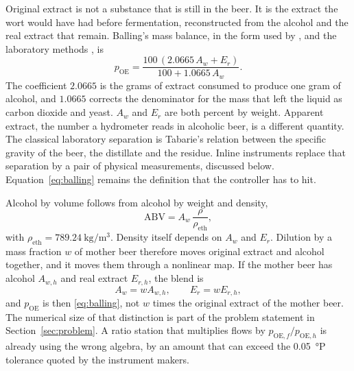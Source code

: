 Original extract is not a substance that is still in the beer. It is the extract the wort would have had before fermentation, reconstructed from the alcohol and the real extract that remain. Balling's mass balance, in the form used by \citet{kunze2019}, \citet{holle2003} and the laboratory methods \citep{mebak2013,asbc2014,ebcanalytica}, is
\begin{equation}
\label{eq:balling}
p_{\mathrm{OE}}
=
\frac{100\,(2.0665\,A_w + E_r)}{100 + 1.0665\,A_w}.
\end{equation}
The coefficient $2.0665$ is the grams of extract consumed to produce one gram of alcohol, and $1.0665$ corrects the denominator for the mass that left the liquid as carbon dioxide and yeast. $A_w$ and $E_r$ are both percent by weight. Apparent extract, the number a hydrometer reads in alcoholic beer, is a different quantity. The classical laboratory separation is Tabarie's relation between the specific gravity of the beer, the distillate and the residue. Inline instruments replace that separation by a pair of physical measurements, discussed below. Equation~\eqref{eq:balling} remains the definition that the controller has to hit.

Alcohol by volume follows from alcohol by weight and density,
\begin{equation}
\label{eq:abv}
\mathrm{ABV}
=
A_w\,\frac{\rho}{\rho_{\mathrm{eth}}},
\end{equation}
with $\rho_{\mathrm{eth}} = \SI{789.24}{\kilogram\per\cubic\metre}$. Density itself depends on $A_w$ and $E_r$. Dilution by a mass fraction $w$ of mother beer therefore moves original extract and alcohol together, and it moves them through a nonlinear map. If the mother beer has alcohol $A_{w,h}$ and real extract $E_{r,h}$, the blend is
\begin{equation}
\label{eq:dilute}
A_w = w A_{w,h},
\qquad
E_r = w E_{r,h},
\end{equation}
and $p_{\mathrm{OE}}$ is then \eqref{eq:balling}, not $w$ times the original extract of the mother beer. The numerical size of that distinction is part of the problem statement in Section~\ref{sec:problem}. A ratio station that multiplies flows by $p_{\mathrm{OE},f}/p_{\mathrm{OE},h}$ is already using the wrong algebra, by an amount that can exceed the \SI{0.05}{\degree}P tolerance quoted by the instrument makers.

